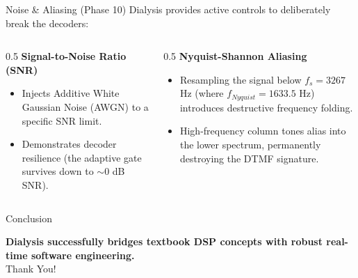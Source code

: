 \documentclass[aspectratio=169]{beamer}
\begin{document}
\begin{frame}{Noise \& Aliasing (Phase 10)}
    Dialysis provides active controls to deliberately break the decoders:
    
    \vspace{0.5cm}
    \begin{columns}
        \begin{column}{0.5\textwidth}
            \textbf{Signal-to-Noise Ratio (SNR)}
            \begin{itemize}
                \item Injects Additive White Gaussian Noise (AWGN) to a specific SNR limit.
                \item Demonstrates decoder resilience (the adaptive gate survives down to $\sim 0$ dB SNR).
            \end{itemize}
        \end{column}
        \begin{column}{0.5\textwidth}
            \textbf{Nyquist-Shannon Aliasing}
            \begin{itemize}
                \item Resampling the signal below $f_s = 3267$ Hz (where $f_{Nyquist} = 1633.5$ Hz) introduces destructive frequency folding.
                \item High-frequency column tones alias into the lower spectrum, permanently destroying the DTMF signature.
            \end{itemize}
        \end{column}
    \end{columns}
\end{frame}

\begin{frame}{Conclusion}
    \begin{center}
        \Large \textbf{Dialysis successfully bridges textbook DSP concepts with robust real-time software engineering.} \\
        \vspace{1cm}
        Thank You!
    \end{center}
\end{frame}
\end{document}

